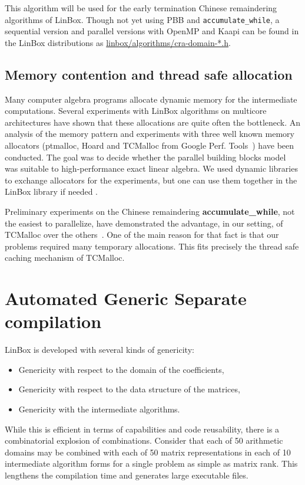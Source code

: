 \documentclass[runningheads,a4paper]{llncs}
\newcommand{\linbox}{{\sc LinBox}\xspace}
\begin{document}
  This algorithm will be used 
  for the early termination Chinese remaindering algorithms of
  \linbox. Though not yet using PBB and \texttt{accumulate\_while}, a
  sequential version and parallel versions with OpenMP and
  Kaapi can be found in the \linbox distributions as 
  \url{linbox/algorithms/cra-domain-*.h}.



\subsection{Memory contention and thread safe allocation}
Many computer algebra programs allocate dynamic memory for the
intermediate computations. Several experiments with \linbox
algorithms on multicore architectures have shown that these
allocations are quite often the bottleneck.
An analysis of the memory pattern and experiments with three well
known memory allocators 
(ptmalloc, Hoard and TCMalloc from Google Perf. Tools~\cite{tcmalloc})
have been conducted. The goal was to decide whether the parallel
building blocks model was suitable to high-performance exact linear
algebra. We used dynamic libraries to exchange allocators for the
experiments, but one can use them together in the \linbox library if
needed \cite[\S 7]{kaltofen:2005:memory}.

Preliminary experiments on the Chinese remaindering {\bf accumulate\_while},
not the easiest to parallelize, have demonstrated the advantage, in
our setting, of TCMalloc over the others~\cite{jgd:2010:crt}.
One of the main reason for that fact is that our problems required
many temporary allocations. This fits precisely the thread safe caching
mechanism of TCMalloc.

\section{Automated Generic Separate compilation}
\linbox is developed with several kinds of genericity:
\begin{itemize}
\item Genericity with respect to the domain of the coefficients,
\item Genericity with respect to the data structure of the matrices,
\item Genericity with the intermediate algorithms.
\end{itemize}
While this is efficient in terms of capabilities and code reusability, there is a combinatorial explosion of combinations.  Consider that each of 50 arithmetic domains may be combined with each of 50 matrix representations in each of 10 intermediate algorithm forms for a single problem as simple as matrix rank. This
lengthens the compilation time and generates large executable files.
\end{document}
